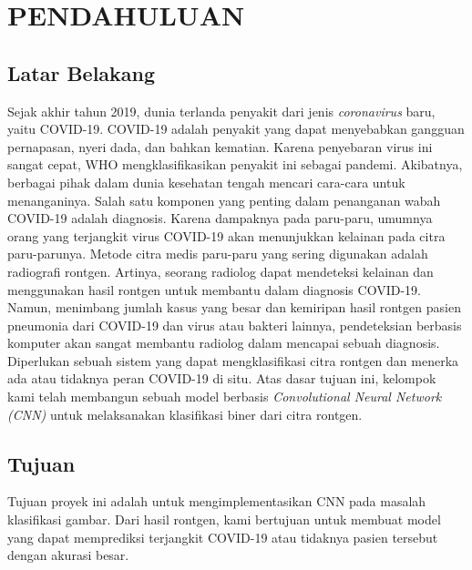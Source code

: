 \chapter{PENDAHULUAN}
\section{Latar Belakang}
Sejak akhir tahun 2019, dunia terlanda penyakit dari jenis \textit{coronavirus} baru, yaitu COVID-19. COVID-19 adalah penyakit yang dapat menyebabkan gangguan pernapasan, nyeri dada, dan bahkan kematian. Karena penyebaran virus ini sangat cepat, WHO mengklasifikasikan penyakit ini sebagai pandemi. Akibatnya, berbagai pihak dalam dunia kesehatan tengah mencari cara-cara untuk menanganinya. Salah satu komponen yang penting dalam penanganan wabah COVID-19 adalah diagnosis. Karena dampaknya pada paru-paru, umumnya orang yang terjangkit virus COVID-19 akan menunjukkan kelainan pada citra paru-parunya. Metode citra medis paru-paru yang sering digunakan adalah radiografi rontgen. Artinya, seorang radiolog dapat mendeteksi kelainan dan menggunakan hasil rontgen untuk membantu dalam diagnosis COVID-19. Namun, menimbang jumlah kasus yang besar dan kemiripan hasil rontgen pasien pneumonia dari COVID-19 dan virus atau bakteri lainnya, pendeteksian berbasis komputer akan sangat membantu radiolog dalam mencapai sebuah diagnosis. Diperlukan sebuah sistem yang dapat mengklasifikasi citra rontgen dan menerka ada atau tidaknya peran COVID-19 di situ. Atas dasar tujuan ini, kelompok kami telah membangun sebuah model berbasis \textit{Convolutional Neural Network (CNN)} untuk melaksanakan klasifikasi biner dari citra rontgen.

\section{Tujuan}
Tujuan proyek ini adalah untuk mengimplementasikan CNN pada masalah klasifikasi gambar. Dari hasil rontgen, kami bertujuan untuk membuat model yang dapat memprediksi terjangkit COVID-19 atau tidaknya pasien tersebut dengan akurasi besar.